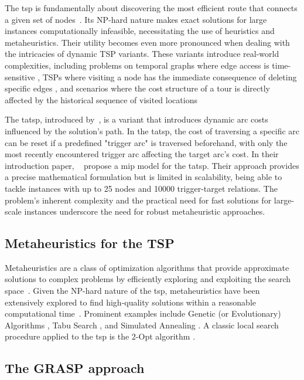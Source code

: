 \documentclass[twocolumn, switch]{article} %
\begin{document}
The \gls{tsp} is fundamentally about discovering the most efficient route that connects a given set of nodes~\cite{Applegate2011}. 
Its NP-hard nature makes exact solutions for large instances computationally infeasible, necessitating the use of heuristics and metaheuristics.
Their utility becomes even more pronounced when dealing with the intricacies of dynamic TSP variants.
These variants introduce real-world complexities, including problems on temporal graphs where edge access is time-sensitive \cite{timedependenttsp}, 
TSPs where visiting a node has the immediate consequence of deleting specific edges \cite{traversaldependenttsp}, and scenarios where the cost structure of a tour is directly affected by the historical sequence of visited locations \cite{Bossek2020}

The \gls{tatsp}, introduced by~\citet{Cerrone}, is a variant that introduces dynamic arc costs influenced by the solution's path. 
In the \gls{tatsp}, the cost of traversing a specific arc can be reset if a predefined "trigger arc" is traversed beforehand, 
with only the most recently encountered trigger arc affecting the target arc's cost. In their introduction paper, ~\citet{Cerrone} 
propose a \gls{mip} model for the \gls{tatsp}. Their approach provides a precise mathematical formulation 
but is limited in scalability, being able to tackle instances with up to 25 nodes and 10000 trigger-target relations. 
The problem's inherent complexity and the practical need for fast solutions for large-scale instances underscore the need for robust metaheuristic approaches.

\subsection{Metaheuristics for the TSP}
\label{sec:metaheuristics_tsp}

Metaheuristics are a class of optimization algorithms that provide approximate solutions to complex problems by efficiently exploring and exploiting the search space~\cite{Gendreau2010}.
Given the NP-hard nature of the \gls{tsp}, metaheuristics have been extensively explored to find high-quality solutions within a reasonable computational time~\cite{toaza2023}.
Prominent examples include Genetic (or Evolutionary) Algorithms \cite{Larranaga1999}, Tabu Search \cite{Knox1994}, and Simulated Annealing \cite{anttsp}.
A classic local search procedure applied to the \gls{tsp} is the 2-Opt algorithm \cite{Croes1958}.

\subsection{The GRASP approach}
\end{document}
